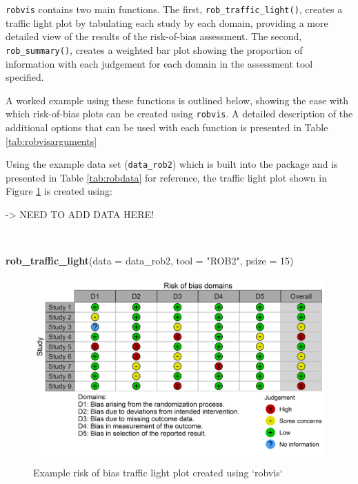 \documentclass[a4paper, twoside]{templates/ociamthesis}
\newenvironment{Shaded}{\begin{snugshade}}{\end{snugshade}}
\newcommand{\DataTypeTok}[1]{\textcolor[rgb]{0.13,0.29,0.53}{#1}}
\newcommand{\DecValTok}[1]{\textcolor[rgb]{0.00,0.00,0.81}{#1}}
\newcommand{\KeywordTok}[1]{\textcolor[rgb]{0.13,0.29,0.53}{\textbf{#1}}}
\newcommand{\NormalTok}[1]{#1}
\newcommand{\StringTok}[1]{\textcolor[rgb]{0.31,0.60,0.02}{#1}}
\renewenvironment{Shaded}
{
  \vspace{4pt}%
  \begin{snugshade}%
}{%
  \end{snugshade}%
  \vspace{4pt}%
}
\begin{document}
\texttt{robvis} contains two main functions. The first, \texttt{rob\_traffic\_light()}, creates a traffic light plot by tabulating each study by each domain, providing a more detailed view of the results of the risk-of-bias assessment. The second, \texttt{rob\_summary()}, creates a weighted bar plot showing the proportion of information with each judgement for each domain in the assessment tool specified.

A worked example using these functions is outlined below, showing the ease with which risk-of-bias plots can be created using \texttt{robvis}. A detailed description of the additional options that can be used with each function is presented in Table \ref{tab:robvisarguments}

Using the example data set (\texttt{data\_rob2}) which is built into the package and is presented in Table \ref{tab:robdata} for reference, the traffic light plot shown in Figure \ref{fig:trafficplot} is created using:

-\textgreater{} NEED TO ADD DATA HERE!

~

\begin{Shaded}
\begin{Highlighting}[]
\KeywordTok{rob_traffic_light}\NormalTok{(}\DataTypeTok{data =}\NormalTok{ data_rob2,}
                  \DataTypeTok{tool =} \StringTok{"ROB2"}\NormalTok{,}
                  \DataTypeTok{psize =} \DecValTok{15}\NormalTok{)}
\end{Highlighting}
\end{Shaded}

\begin{figure}
\includegraphics[width=1\linewidth]{figures/sys-rev-tools/example-rob-traffic-light-plot} \caption{Example risk of bias traffic light plot created using `robvis`}\label{fig:trafficplot}
\end{figure}
\end{document}
